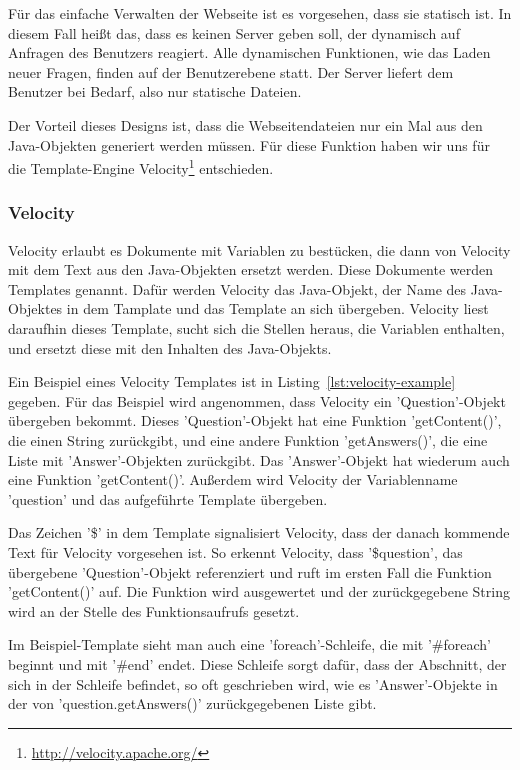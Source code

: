 \label{Sokol}
Für das einfache Verwalten der Webseite ist es vorgesehen, dass sie statisch ist.
In diesem Fall heißt das, dass es keinen Server geben soll, der dynamisch auf Anfragen des Benutzers reagiert.
Alle dynamischen Funktionen, wie das Laden neuer Fragen, finden auf der Benutzerebene statt.
Der Server liefert dem Benutzer bei Bedarf, also nur statische Dateien.

Der Vorteil dieses Designs ist, dass die Webseitendateien nur ein Mal aus den Java-Objekten generiert werden müssen.
Für diese Funktion haben wir uns für die Template-Engine Velocity\footnote{\url{http://velocity.apache.org/}} entschieden.

\subsubsection{Velocity}

Velocity erlaubt es Dokumente mit Variablen zu bestücken, die dann von Velocity mit dem Text aus den Java-Objekten ersetzt werden.
Diese Dokumente werden Templates genannt.
Dafür werden Velocity das Java-Objekt, der Name des Java-Objektes in dem Tamplate und das Template an sich übergeben.
Velocity liest daraufhin dieses Template, sucht sich die Stellen heraus, die Variablen enthalten, und ersetzt diese mit den Inhalten des Java-Objekts.

Ein Beispiel eines Velocity Templates ist in Listing~\ref{lst:velocity-example} gegeben.
Für das Beispiel wird angenommen, dass Velocity ein 'Question'-Objekt übergeben bekommt.
Dieses 'Question'-Objekt hat eine Funktion 'getContent()', die einen String zurückgibt, und eine andere Funktion 'getAnswers()', die eine Liste mit 'Answer'-Objekten zurückgibt.
Das 'Answer'-Objekt hat wiederum auch eine Funktion 'getContent()'.
Außerdem wird Velocity der Variablenname 'question' und das aufgeführte Template übergeben.

Das Zeichen '\$' in dem Template signalisiert Velocity, dass der danach kommende Text für Velocity vorgesehen ist.
So erkennt Velocity, dass '\$question', das übergebene 'Question'-Objekt referenziert und ruft im ersten Fall die Funktion 'getContent()' auf.
Die Funktion wird ausgewertet und der zurückgegebene String wird an der Stelle des Funktionsaufrufs gesetzt.

Im Beispiel-Template sieht man auch eine 'foreach'-Schleife, die mit '\#foreach' beginnt und mit '\#end' endet.
Diese Schleife sorgt dafür, dass der Abschnitt, der sich in der Schleife befindet, so oft geschrieben wird, wie es 'Answer'-Objekte in der von 'question.getAnswers()' zurückgegebenen Liste gibt.

